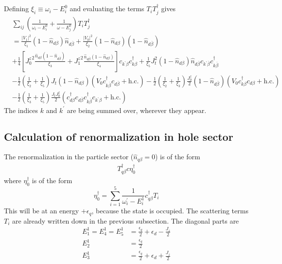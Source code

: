 \documentclass[twoside]{report}
\numberwithin{equation}{section}
\begin{document}
\\\\Defining \(\xi_i \equiv \omega_i - E_i^0\) and evaluating the terms \(T_i T_j^\dagger\) gives
\begin{equation}\begin{aligned}
	&\sum_{ij} \left(\frac{1}{\omega_i - E^0_i} + \frac{1}{\omega - E^0_j}\right) T_i T_j^\dagger\\ 
	&=\frac{|V_1|^2}{\xi_1}\left( 1 - \hat n_{d\beta} \right) \hat n_{d\overline\beta} + \frac{|V_0|^2}{\xi_2}\left( 1 - \hat n_{d\beta} \right) \left( 1 - \hat n_{d\overline\beta} \right) \\
	&+ \frac{1}{4}\left[ {J_0^z}^2\frac{\hat n_{d\beta}\left( 1 - \hat n_{d\overline\beta} \right) }{\xi_3} + {J_1^z}^2\frac{\hat n_{d\overline\beta}\left( 1 - \hat n_{d\beta} \right)}{\xi_4} \right]c_{k^\prime\beta}c^\dagger_{k\beta} + \frac{1}{\xi_5}J_t^2 \left( 1 - \hat n_{d\beta} \right) \hat n_{d\overline\beta} c_{k^\prime\overline\beta}c^\dagger_{k\overline\beta} \\
	&- \frac{1}{2} \left(\frac{1}{\xi_2} + \frac{1}{\xi_5}\right)J_t\left( 1 - \hat n_{d\beta}\right) \left(V_0 c^\dagger_{k\overline\beta}c_{d\overline\beta} + \text{h.c.}\right) - \frac{1}{2}\left(\frac{1}{\xi_2} + \frac{1}{\xi_3}\right)\frac{J^z_0}{2}\left(1 - \hat n_{d\overline\beta}\right)\left(V_0 c^\dagger_{k\beta}c_{d\beta} + \text{h.c.}\right) \\
	&-\frac{1}{2}\left(\frac{1}{\xi_3} + \frac{1}{\xi_5}\right)\frac{J_t J^z_0}{2}\left(c^\dagger_{d\beta}c_{d\overline\beta}c^\dagger_{k\overline\beta}c_{k^\prime\beta} + \text{h.c.}\right)
\end{aligned}\end{equation}
The indices \(k\) and \(k^\prime\) are being summed over, wherever they appear.
\subsection{Calculation of renormalization in hole sector}
The renormalization in the particle sector (\(\hat n_{q\beta}=0\)) is of the form
\begin{equation}\begin{aligned}
	T^\dagger_{q\beta}c \eta_0^\dagger
\end{aligned}\end{equation}
where \(\eta_0^\dagger\) is of the form
\begin{equation}
	\eta_0^\dagger = \sum_{i=1}^5\frac{1}{\omega^\prime_i - E_i^1}c^\dagger_{q\beta} T_i
\end{equation}
This will be at an energy \(+\epsilon_q\), because the state is occupied. The scattering terms \(T_i\) are already written down in the previous subsection. The diagonal parts are
\begin{equation}\begin{aligned}
	E^1_1 = E^1_4 = E^1_5 &= \frac{\epsilon_q}{2} + \epsilon_d - \frac{J_z}{2}\\
	E^1_2 &= \frac{\epsilon_q}{2}\\
	E^1_3 &= \frac{\epsilon_q}{2} + \epsilon_d + \frac{J_z}{2} \\
\end{aligned}\end{equation}
\end{document}
